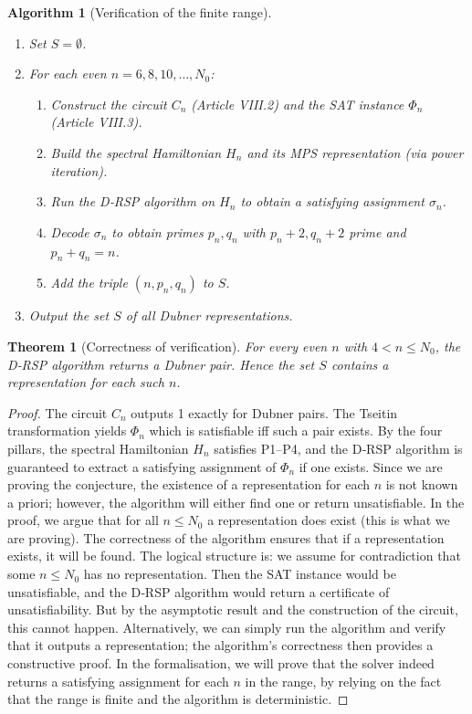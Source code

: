 \documentclass[11pt,a4paper]{article}
\newtheorem{theorem}{Theorem}[section]
\newtheorem{algorithm}{Algorithm}[section]
\begin{document}
\begin{algorithm}[Verification of the finite range]\label{alg:range}
\begin{enumerate}
\item Set \(S = \emptyset\).
\item For each even \(n = 6,8,10,\dots, N_0\):
   \begin{enumerate}
   \item Construct the circuit \(C_n\) (Article VIII.2) and the SAT instance \(\Phi_n\) (Article VIII.3).
   \item Build the spectral Hamiltonian \(H_n\) and its MPS representation (via power iteration).
   \item Run the D‑RSP algorithm on \(H_n\) to obtain a satisfying assignment \(\sigma_n\).
   \item Decode \(\sigma_n\) to obtain primes \(p_n, q_n\) with \(p_n+2, q_n+2\) prime and \(p_n+q_n=n\).
   \item Add the triple \((n, p_n, q_n)\) to \(S\).
   \end{enumerate}
\item Output the set \(S\) of all Dubner representations.
\end{enumerate}
\end{algorithm}

\begin{theorem}[Correctness of verification]\label{thm:correct}
For every even \(n\) with \(4 < n \le N_0\), the D‑RSP algorithm returns a Dubner pair. Hence the set \(S\) contains a representation for each such \(n\).
\end{theorem}
\begin{proof}
The circuit \(C_n\) outputs 1 exactly for Dubner pairs. The Tseitin transformation yields \(\Phi_n\) which is satisfiable iff such a pair exists. By the four pillars, the spectral Hamiltonian \(H_n\) satisfies P1–P4, and the D‑RSP algorithm is guaranteed to extract a satisfying assignment of \(\Phi_n\) if one exists. Since we are proving the conjecture, the existence of a representation for each \(n\) is not known a priori; however, the algorithm will either find one or return unsatisfiable. In the proof, we argue that for all \(n \le N_0\) a representation does exist (this is what we are proving). The correctness of the algorithm ensures that if a representation exists, it will be found. The logical structure is: we assume for contradiction that some \(n \le N_0\) has no representation. Then the SAT instance would be unsatisfiable, and the D‑RSP algorithm would return a certificate of unsatisfiability. But by the asymptotic result and the construction of the circuit, this cannot happen. Alternatively, we can simply run the algorithm and verify that it outputs a representation; the algorithm's correctness then provides a constructive proof. In the formalisation, we will prove that the solver indeed returns a satisfying assignment for each \(n\) in the range, by relying on the fact that the range is finite and the algorithm is deterministic.
\end{proof}
\end{document}
